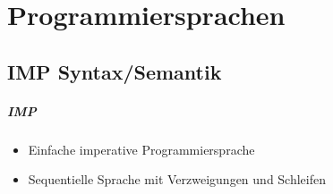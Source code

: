 \chapter{Programmiersprachen}
	\section{IMP Syntax/Semantik}
		\paragraph{IMP}
			\begin{itemize}
				\item Einfache imperative Programmiersprache
				\item Sequentielle Sprache mit Verzweigungen und Schleifen
			\end{itemize}


